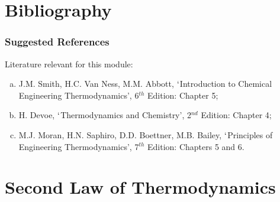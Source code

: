 \documentclass[10pt,compress]{beamer}
\begin{document}
\section{Bibliography}
\begin{frame}
 \frametitle{Suggested References}
  Literature relevant for this module:
  \begin{enumerate}[(a)]
   \item J.M. Smith, H.C. Van Ness, M.M. Abbott, $\lq$Introduction to Chemical Engineering Thermodynamics', 6$^{th}$ Edition: Chapter 5;
   \item H. Devoe, $\lq$Thermodynamics and Chemistry', 2$^{nd}$ Edition: Chapter 4;
   \item M.J. Moran, H.N. Saphiro, D.D. Boettner, M.B. Bailey, $\lq$Principles of Engineering Thermodynamics', 7$^{th}$ Edition: Chapters 5 and 6.
  \end{enumerate}
\end{frame}


\section{Second Law of Thermodynamics} 
\end{document}

